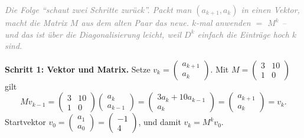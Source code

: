 \documentclass[a4paper,12pt]{article}
\begin{document}
\textcolor{gray}{\small\textit{Die Folge ``schaut zwei Schritte zur\"uck''. Packt man $(a_{k+1}, a_k)$ in einen Vektor, macht die Matrix $M$ aus dem alten Paar das neue. $k$-mal anwenden $=$ $M^k$ -- und das ist \"uber die Diagonalisierung leicht, weil $D^k$ einfach die Eintr\"age hoch $k$ sind.}}

\textbf{Schritt 1: Vektor und Matrix.} Setze $v_k = \begin{pmatrix} a_{k+1} \\ a_k \end{pmatrix}$. Mit $M = \begin{pmatrix} 3 & 10 \\ 1 & 0 \end{pmatrix}$ gilt
\[
M v_{k-1} = \begin{pmatrix} 3 & 10 \\ 1 & 0 \end{pmatrix}\begin{pmatrix} a_k \\ a_{k-1} \end{pmatrix} = \begin{pmatrix} 3a_k + 10 a_{k-1} \\ a_k \end{pmatrix} = \begin{pmatrix} a_{k+1} \\ a_k \end{pmatrix} = v_k.
\]
Startvektor $v_0 = \begin{pmatrix} a_1 \\ a_0 \end{pmatrix} = \begin{pmatrix} -1 \\ 4 \end{pmatrix}$, und damit $v_k = M^k v_0$.
\end{document}
